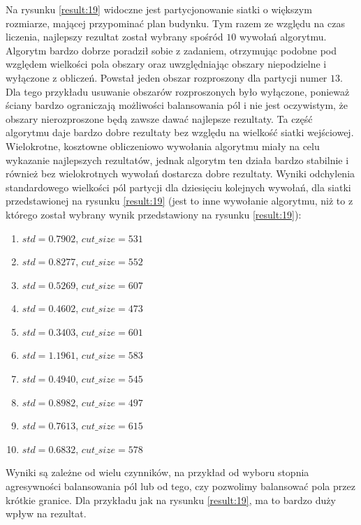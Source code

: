 Na rysunku \ref{result:19} widoczne jest partycjonowanie siatki o większym rozmiarze, mającej
przypominać plan budynku.
Tym razem ze względu na czas liczenia, najlepszy rezultat został wybrany spośród $10$ wywołań algorytmu.
Algorytm bardzo dobrze poradził sobie z zadaniem, otrzymując podobne pod względem wielkości pola obszary oraz uwzględniając
obszary niepodzielne i wyłączone z obliczeń.
Powstał jeden obszar rozproszony dla partycji numer $13$.
Dla tego przykładu usuwanie obszarów rozproszonych było wyłączone, ponieważ ściany bardzo
ograniczają możliwości balansowania pól i nie jest oczywistym, że obszary nierozproszone będą zawsze dawać najlepsze rezultaty.
Ta część algorytmu daje bardzo dobre rezultaty bez względu na wielkość siatki wejściowej.
Wielokrotne, kosztowne obliczeniowo wywołania algorytmu miały na celu wykazanie najlepszych rezultatów, jednak algorytm
ten działa bardzo stabilnie i również bez wielokrotnych wywołań dostarcza dobre rezultaty.
Wyniki odchylenia standardowego wielkości pól partycji dla dziesięciu kolejnych wywołań, dla siatki przedstawionej
na rysunku \ref{result:19} (jest to inne wywołanie algorytmu, niż to z którego został wybrany wynik przedstawiony na rysunku
\ref{result:19}):
\begin{enumerate}
    \item $std = 0.7902$, $cut\_size=531$
    \item $std = 0.8277$, $cut\_size=552$
    \item $std = 0.5269$, $cut\_size=607$
    \item $std = 0.4602$, $cut\_size=473$
    \item $std = 0.3403$, $cut\_size=601$
    \item $std = 1.1961$, $cut\_size=583$
    \item $std = 0.4940$, $cut\_size=545$
    \item $std = 0.8982$, $cut\_size=497$
    \item $std = 0.7613$, $cut\_size=615$
    \item $std = 0.6832$, $cut\_size=578$
\end{enumerate}

Wyniki są zależne od wielu czynników, na przykład od wyboru stopnia agresywności balansowania pól lub od tego,
czy pozwolimy balansować pola przez krótkie granice.
Dla przykładu jak na rysunku \ref{result:19}, ma to bardzo duży wpływ na rezultat.

